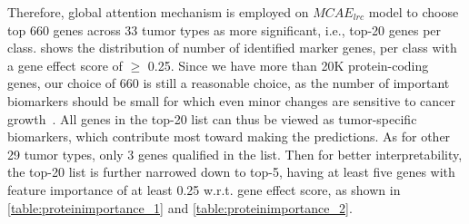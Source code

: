 \hspace*{3.5mm} Therefore, global attention mechanism is employed on $MCAE_{lrc}$ model to choose top 660 genes across 33 tumor types as more significant, i.e., top-20 genes per class.
 shows the distribution of number of identified marker genes, per class with a gene effect score of $\geq$ 0.25. Since we have more than 20K protein-coding genes, our choice of 660 is still a reasonable choice, as the number of important biomarkers should be small for which even minor changes are sensitive to cancer growth~\cite{zuo2019identification}. All genes in the top-20 list can thus be viewed as tumor-specific biomarkers, which contribute most toward making the predictions. As for other 29 tumor types, only 3 genes qualified in the list. %
Then for better interpretability, the top-20 list is further narrowed down to top-5, having at least five genes with feature importance of at least 0.25 w.r.t. gene effect score, as shown in \cref{table:proteinimportance_1} and  \cref{table:proteinimportance_2}. %

